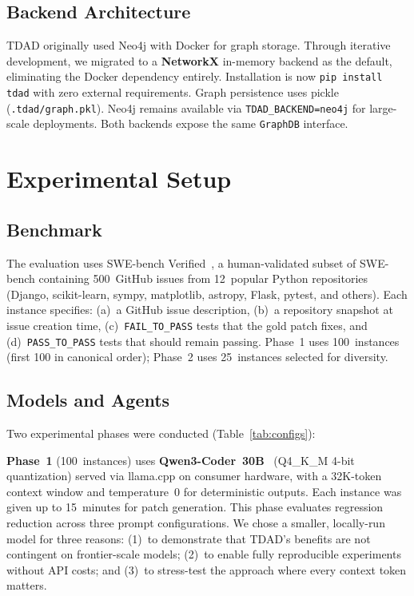 \documentclass[sigconf,nonacm]{acmart}
\begin{document}
\subsection{Backend Architecture}

\textsc{TDAD} originally used Neo4j with Docker for graph storage.
Through iterative development, we migrated to a \textbf{NetworkX}
in-memory backend as the default, eliminating the Docker dependency
entirely.  Installation is now \texttt{pip install tdad} with zero
external requirements.  Graph persistence uses pickle
(\texttt{.tdad/graph.pkl}).  Neo4j remains available via
\texttt{TDAD\_BACKEND=neo4j} for large-scale deployments.  Both
backends expose the same \texttt{GraphDB} interface.


\section{Experimental Setup}
\label{sec:setup}

\subsection{Benchmark}

The evaluation uses SWE-bench Verified~\cite{jimenez2024swebench}, a human-validated
subset of SWE-bench containing 500~GitHub issues from 12~popular Python
repositories (Django, scikit-learn, sympy, matplotlib, astropy, Flask, pytest,
and others).  Each instance specifies: (a)~a GitHub issue description,
(b)~a repository snapshot at issue creation time, (c)~\texttt{FAIL\_TO\_PASS}
tests that the gold patch fixes, and (d)~\texttt{PASS\_TO\_PASS} tests that
should remain passing.  Phase~1 uses 100~instances (first 100 in canonical
order); Phase~2 uses 25~instances selected for diversity.

\subsection{Models and Agents}

Two experimental phases were conducted (Table~\ref{tab:configs}):

\textbf{Phase~1} (100~instances) uses \textbf{Qwen3-Coder~30B}~\cite{qwen2025qwen3coder} (Q4\_K\_M 4-bit quantization) served via llama.cpp on
consumer hardware, with a 32K-token context window and temperature~0 for
deterministic outputs.  Each instance was given up to 15~minutes for patch
generation.  This phase evaluates regression reduction across three prompt
configurations.  We chose a smaller, locally-run model for three reasons:
(1)~to demonstrate that \textsc{TDAD}'s benefits are not contingent on
frontier-scale models; (2)~to enable fully reproducible experiments without
API costs; and (3)~to stress-test the approach where every context token
matters.
\end{document}
